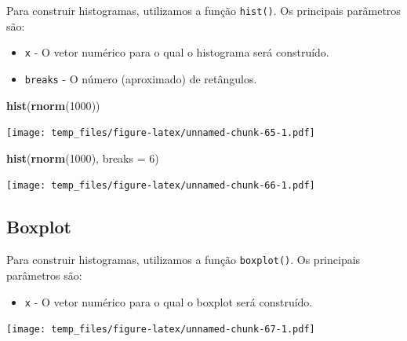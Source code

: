 \documentclass[
]{book}
\newenvironment{Shaded}{\begin{snugshade}}{\end{snugshade}}
\newcommand{\DataTypeTok}[1]{\textcolor[rgb]{0.13,0.29,0.53}{#1}}
\newcommand{\DecValTok}[1]{\textcolor[rgb]{0.00,0.00,0.81}{#1}}
\newcommand{\KeywordTok}[1]{\textcolor[rgb]{0.13,0.29,0.53}{\textbf{#1}}}
\newcommand{\NormalTok}[1]{#1}
\newcommand{\OperatorTok}[1]{\textcolor[rgb]{0.81,0.36,0.00}{\textbf{#1}}}
\newcommand{\StringTok}[1]{\textcolor[rgb]{0.31,0.60,0.02}{#1}}
\providecommand{\tightlist}{%
  \setlength{\itemsep}{0pt}\setlength{\parskip}{0pt}}
\begin{document}
Para construir histogramas, utilizamos a função \texttt{hist()}. Os principais parâmetros são:

\begin{itemize}
\tightlist
\item
  \texttt{x} - O vetor numérico para o qual o histograma será construído.
\item
  \texttt{breaks} - O número (aproximado) de retângulos.
\end{itemize}

\begin{Shaded}
\begin{Highlighting}[]
\KeywordTok{hist}\NormalTok{(}\KeywordTok{rnorm}\NormalTok{(}\DecValTok{1000}\NormalTok{))}
\end{Highlighting}
\end{Shaded}

\texttt{[image: temp\_files/figure-latex/unnamed-chunk-65-1.pdf]}

\begin{Shaded}
\begin{Highlighting}[]
\KeywordTok{hist}\NormalTok{(}\KeywordTok{rnorm}\NormalTok{(}\DecValTok{1000}\NormalTok{), }\DataTypeTok{breaks =} \DecValTok{6}\NormalTok{)}
\end{Highlighting}
\end{Shaded}

\texttt{[image: temp\_files/figure-latex/unnamed-chunk-66-1.pdf]}

\hypertarget{boxplot}{%
\subsection{Boxplot}\label{boxplot}}

Para construir histogramas, utilizamos a função \texttt{boxplot()}. Os principais parâmetros são:

\begin{itemize}
\tightlist
\item
  \texttt{x} - O vetor numérico para o qual o boxplot será construído.
\end{itemize}

\begin{Shaded}
\end{Shaded}

\texttt{[image: temp\_files/figure-latex/unnamed-chunk-67-1.pdf]}
\end{document}
